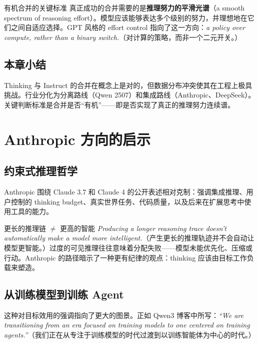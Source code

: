 \documentclass[a4paper]{article}
\begin{document}
\begin{importantbox}{有机合并的关键标准}
真正成功的合并需要的是\textbf{推理努力的平滑光谱}（a smooth spectrum of reasoning effort）。模型应该能够表达多个级别的努力，并理想地在它们之间自适应选择。GPT 风格的 effort control 指向了这一方向：\textit{a policy over compute, rather than a binary switch.}（对计算的策略，而非一个二元开关。）
\end{importantbox}

\subsection{本章小结}

Thinking 与 Instruct 的合并在概念上是对的，但数据分布冲突使其在工程上极具挑战。行业分化为分离路线（Qwen 2507）和集成路线（Anthropic、DeepSeek）。关键判断标准是合并是否``有机''——即是否实现了真正的推理努力连续谱。


\section{Anthropic 方向的启示}

\subsection{约束式推理哲学}

Anthropic 围绕 Claude 3.7 和 Claude 4 的公开表述相对克制：强调集成推理、用户控制的 thinking budget、真实世界任务、代码质量，以及后来在扩展思考中使用工具的能力。

\begin{importantbox}{更长的推理链 $\neq$ 更高的智能}
\textit{Producing a longer reasoning trace doesn't automatically make a model more intelligent.}（产生更长的推理轨迹并不会自动让模型更智能。）过度的可见推理往往意味着分配失败——模型未能优先化、压缩或行动。Anthropic 的路径暗示了一种更有纪律的观点：thinking 应该由目标工作负载来塑造。
\end{importantbox}

\subsection{从训练模型到训练 Agent}

这种对目标效用的强调指向了更大的图景。正如 Qwen3 博客中所写：\textit{``We are transitioning from an era focused on training models to one centered on training agents.''}（我们正在从专注于训练模型的时代过渡到以训练智能体为中心的时代。）
\end{document}
